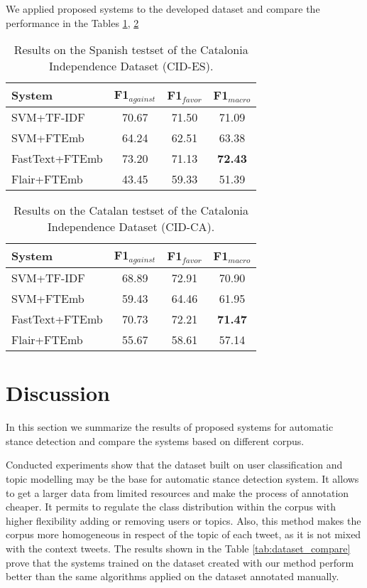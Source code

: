 \documentclass[10pt, a4paper]{article}
\begin{document}
We applied proposed systems to the developed dataset and compare the performance in the Tables \ref{tab:result_indep_es}, \ref{tab:result_indep_ca}

\begin{table}[!ht]
\centering
\begin{tabular}{lccc}\hline
\textbf{System} & F1$_{against}$ & F1$_{favor}$ & F1$_{macro}$ \\ \hline
SVM+TF-IDF & 70.67 & 71.50 & 71.09 \\
SVM+FTEmb & 64.24 & 62.51 & 63.38 \\
FastText+FTEmb & 73.20 & 71.13 & \textbf{72.43} \\
Flair+FTEmb & 43.45 & 59.33 & 51.39 \\ \hline
\end{tabular}
\caption{Results on the Spanish testset of the Catalonia Independence Dataset (CID-ES).}\label{tab:result_indep_es}
\end{table}

\begin{table}[!ht]
\begin{tabular}{lccc}\hline
\textbf{System} & F1$_{against}$ & F1$_{favor}$ & F1$_{macro}$ \\ \hline
SVM+TF-IDF & 68.89 & 72.91 & 70.90 \\
SVM+FTEmb & 59.43 & 64.46 & 61.95 \\
FastText+FTEmb & 70.73 & 72.21 & \textbf{71.47} \\
Flair+FTEmb & 55.67 & 58.61 & 57.14 \\ \hline
\end{tabular}
\caption{Results on the Catalan testset of the Catalonia Independence Dataset (CID-CA).}\label{tab:result_indep_ca}
\end{table}


\section{Discussion}\label{sec:discussion}

In this section we summarize the results of proposed systems for automatic stance detection and compare the systems based on different corpus.

Conducted experiments show that the dataset built on user classification and topic modelling may be the base for automatic stance detection system. It allows to get a larger data from limited resources and make the process of annotation cheaper. It permits to regulate the class distribution within the corpus with higher flexibility adding or removing users or topics. Also, this method makes the corpus more homogeneous in respect of the topic of each tweet, as it is not mixed with the context tweets. The results shown in the Table \ref{tab:dataset_compare} prove that the systems trained on the dataset created with our method perform better than the same algorithms applied on the dataset annotated manually.
\end{document}
